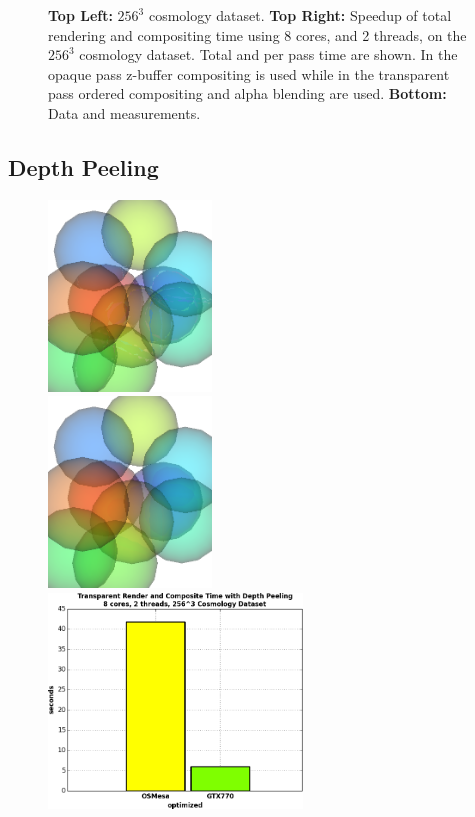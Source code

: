 \documentclass[a4paper,10pt]{report}
\begin{document}
\begin{figure}
\caption{\footnotesize {\bf Top Left:} $256^3$ cosmology dataset. {\bf Top Right:} Speedup of total rendering and compositing time using 8 cores, and 2 threads, on the $256^3$ cosmology dataset. Total and per pass time are shown. In the opaque pass z-buffer compositing is used while in the transparent pass ordered compositing and alpha blending are used. {\bf Bottom:} Data and measurements.}
\label{fig:speedup_cosmo}
\end{figure}

\subsection*{Depth Peeling}
\begin{figure}
\centering
\begin{minipage}{0.28\textwidth}
\begin{center}
 \includegraphics[height=2.0in]{./spheres_with_sort_crop.png}
 \end{center}
\end{minipage}
\begin{minipage}{0.28\textwidth}
 \begin{center}
 \includegraphics[height=2.0in]{./spheres_with_depth_peel_crop.png}
\end{center}
\end{minipage}
\begin{minipage}{0.3\textwidth}
 \begin{center}
 \includegraphics[height=2.25in]{./depth_peeling_time_cosmo.png}

\end{center}
\end{minipage}
\end{figure}
\end{document}
